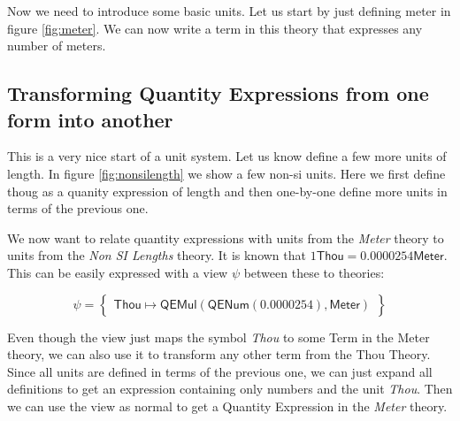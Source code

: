 Now we need to introduce some basic units. Let us start by just defining meter in figure \ref{fig:meter}. We can now write a term in this theory that expresses any number of meters.



\subsection{Transforming Quantity Expressions from one form into another}

This is a very nice start of a unit system. Let us know define a few more units of length. In figure \ref{fig:nonsilength} we show a few non-si units. Here we first define thoug as a quanity expression of length and then one-by-one define more units in terms of the previous one.


We now want to relate quantity expressions with units from the \textit{Meter} theory to units from the \textit{Non SI Lengths} theory. It is known that $1 \mathsf{Thou} = 0.0000254 \mathsf{Meter}$. This can be easily expressed with a view $\psi$ between these to theories:

\[
\psi = \left\{\begin{array}{l}
  \mathsf{Thou} \mapsto \mathsf{QEMul} \left( \mathsf{QENum} \left( 0.0000254 \right), \mathsf{Meter} \right)
\end{array}\right\}
\]

Even though the view just maps the symbol \textit{Thou} to some Term in the Meter theory, we can also use it to transform any other term from the Thou Theory. Since all units are defined in terms of the previous one, we can just expand all definitions to get an expression containing only numbers and the unit \textit{Thou}. Then we can use the view as normal to get a Quantity Expression in the \textit{Meter} theory. 
